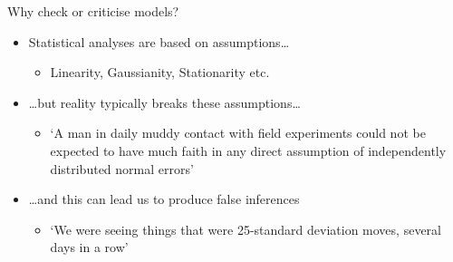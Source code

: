 \begin{frame}{Why check or criticise models?}
  \begin{itemize}
    \item Statistical analyses are based on assumptions\dots
    \begin{itemize}
       \item \eg Linearity, Gaussianity, Stationarity etc.
     \end{itemize}
    \vspace{\baselineskip}
    \pause
    \item \dots but reality typically breaks these assumptions\dots
    \begin{itemize}
       \item `A man in daily muddy contact with field experiments could not be expected to have much faith in any direct assumption of independently distributed normal errors' \cite{Box1976-yg}
     \end{itemize}
    \vspace{\baselineskip}
    \pause
    \item \dots and this can lead us to produce false inferences
    \begin{itemize}
       \item `We were seeing things that were 25-standard deviation moves, several 
days in a row'
     \end{itemize}
  \end{itemize}
\end{frame}

